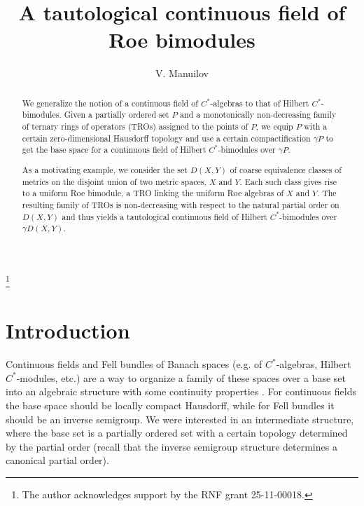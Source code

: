 \documentclass[12pt]{amsart}
\title{A tautological continuous field of Roe bimodules}
\theoremstyle{definition}
\begin{document}
\author{V. Manuilov}

\date{}

\address{Moscow Center for Fundamental and Applied Mathematics, Moscow State University,
Leninskie Gory 1, Moscow, 
119991, Russia}



\thanks{The author acknowledges support by the RNF grant 25-11-00018.}





\maketitle

\begin{abstract}

We generalize the notion of a continuous field of $C^*$-algebras to that of Hilbert $C^*$-bimodules. Given a partially ordered set $P$ and a monotonically non-decreasing family of ternary rings of operators (TROs) assigned to the points of $P$, we equip $P$ with a certain zero-dimensional Hausdorff topology and use a certain compactification $\gamma P$ to get the base space for a continuous field of Hilbert $C^*$-bimodules over $\gamma P$.
 
As a motivating example, we consider the set $D(X,Y)$ of coarse equivalence classes of metrics on the disjoint union of two metric spaces, $X$ and $Y$. Each such class gives rise to a uniform Roe bimodule, a TRO linking the uniform Roe algebras of $X$ and $Y$. The resulting family of TROs is non-decreasing with respect to the natural partial order on $D(X,Y)$ and thus yields a tautological continuous field of Hilbert $C^*$-bimodules over $\gamma D(X,Y)$.

\end{abstract}

\section{Introduction}

Continuous fields and Fell bundles of Banach spaces (e.g. of $C^*$-algebras, Hilbert $C^*$-modules, etc.) are a way to organize a family of these spaces over a base set into an algebraic structure with some continuity properties \cite{Exel,Dixmier}. For continuous fields the base space should be locally compact Hausdorff, while for Fell bundles it should be an inverse semigroup. We were interested in an intermediate structure, where the base set is a partially ordered set with a certain topology determined by the partial order (recall that the inverse semigroup structure determines a canonical partial order). 
\end{document}
